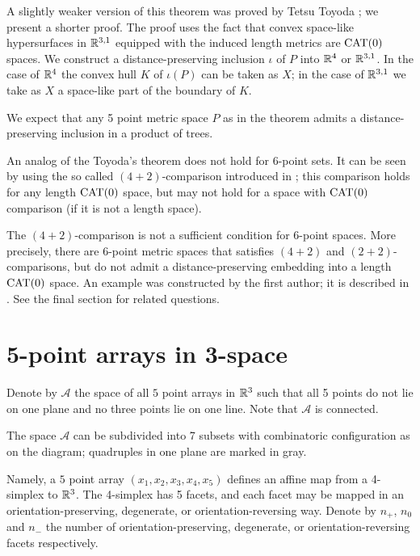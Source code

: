 \documentclass{article}
\begin{document}
A slightly weaker version of this theorem was proved by Tetsu Toyoda \cite{toyoda};
we present a shorter proof.
The proof uses the fact that convex space-like hypersurfaces in $\mathbb{R}^{3,1}$ equipped with the induced length metrics are $\mathrm{CAT}(0)$ spaces.
We construct a distance-preserving inclusion $\iota$ of $P$ into $\mathbb{R}^4$ or $\mathbb{R}^{3,1}$.
In the case of $\mathbb{R}^4$ the convex hull $K$ of $\iota(P)$ can be taken as $X$;
in the case of $\mathbb{R}^{3,1}$ we take as $X$ a space-like part of the boundary of $K$.

We expect that any 5 point metric space $P$ as in the theorem admits a distance-preserving inclusion in a product of trees.

An analog of the Toyoda's theorem does not hold for 6-point sets.
It can be seen by using the so called $(4{+}2)$-comparison introduced in \cite{alexander-kapovitch-petrunin-2011};
this comparison holds for any length $\mathrm{CAT}(0)$ space, but may not hold for a space with $\mathrm{CAT}(0)$ comparison (if it is not a length space).

{\sloppy

The $(4{+}2)$-comparison is not a sufficient condition for $6$-point spaces.
More precisely, there are 6-point metric spaces that satisfies $(4{+}2)$ and $(2{+}2)$-comparisons, but do not admit a distance-preserving embedding into a length $\mathrm{CAT}(0)$ space.
An example was constructed by the first author; it is described in \cite{alexander-kapovitch-petrunin-2011}.
See the final section for related questions.

}

\section{5-point arrays in 3-space}

Denote by $\mathcal{A}$ the space of all $5$ point arrays in $\mathbb{R}^3$ such that all 5 points do not lie on one plane and no three points lie on one line.
Note that $\mathcal{A}$ is connected.

The space $\mathcal{A}$ can be subdivided into 7 subsets with combinatoric configuration as on the diagram;
quadruples in one plane are marked in gray.

Namely, a $5$ point array  $(x_1,x_2,x_3,x_4,x_5)$ defines an affine map from a 4-simplex to $\mathbb{R}^3$.
The 4-simplex has 5 facets, and each facet may be mapped in an orientation-preserving, degenerate, or orientation-reversing way.
Denote by $n_+$, $n_0$ and $n_-$ the number of orientation-preserving, degenerate, or orientation-reversing facets respectively.
\end{document}
